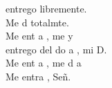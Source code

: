 \begin{cancion}
	\begin{chorus}%
	 entrego libremente.  \\
	Me d totalmte.  \\
	Me ent a , me y   \\
	 entrego del do a , mi D.  \\
	Me ent a , me d a \\
	Me entra , Señ. \\
	\end{chorus}%
	\jump\\
\end{cancion}%
